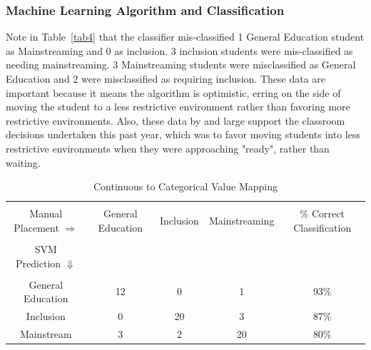 \documentclass[twoside]{article}
\begin{document}
\subsubsection{Machine Learning Algorithm and Classification}

Note in Table~\ref{tab4} that the classifier mis-classified 1 General Education student as Mainstreaming and 0 as inclusion. 3 inclusion students were mis-classified as needing mainstreaming. 3 Mainstreaming students were misclassified as General Education and 2 were misclassified as requiring inclusion. These data are important because it means the algorithm is optimistic, erring on the side of moving the student to a less restrictive environment rather than favoring more restrictive environments. Also, these data by and large support the classroom decisions undertaken this past year, which was to favor moving students into less restrictive environments when they were approaching "ready", rather than waiting. 
%
%
%
%
\begin{table}[tbp!]
	\centering
	\caption{Continuous to Categorical Value Mapping}
	\label{tab7}
	\begin{tabular}{ccccc}
		\hline \\
		Manual Placement $ \Rightarrow $ & General Education & Inclusion & Mainstreaming & \% Correct Classification\\
		\hline \\
		SVM Prediction $ \Downarrow $ & & \\ \\
		General Education & 12 & 0 & 1 & 93\% \\
		Inclusion & 0 & 20 & 3 & 87\% \\
		Mainstream & 3 & 2 & 20 & 80\% \\
		\hline
	\end{tabular}
\end{table}
%
%
%
%
%
%
%
%
\end{document}
